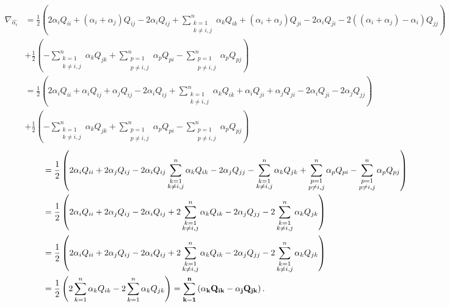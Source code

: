 \documentclass[11pt,letterpaper]{article}
\newcommand{\sumk}{\sum_{k=1}^n}
\begin{document}
\begin{enumerate}
\begin{align*}
\nabla_{\hat{\alpha_i}}&=\frac{1}{2}\left(2\alpha_iQ_{ii}+(\alpha_i +\alpha_j)Q_{ij}-2\alpha_iQ_{ij}+ \sum_{\substack{k=1\\ k\neq i,j}}^n  \alpha_k Q_{ik} + (\alpha_i +\alpha_j) Q_{ji}-2\alpha_iQ_{ji}-2((\alpha_i +\alpha_j)-\alpha_i)Q_{jj} \right)\\
&+\frac{1}{2}\left(-\sum_{\substack{k=1\\ k\neq i,j}}^n \alpha_k Q_{jk}+\sum_{\substack{p=1 \\ p\neq i,j}}^n \alpha_pQ_{pi}-\sum_{\substack{p=1 \\ p\neq i,j}}^n \alpha_pQ_{pj} \right)\\
&= \frac{1}{2}\left(2\alpha_iQ_{ii}+\alpha_iQ_{ij} +\alpha_jQ_{ij}-2\alpha_iQ_{ij}+ \sum_{\substack{k=1\\ k\neq i,j}}^n  \alpha_k Q_{ik} + \alpha_iQ_{ji} +\alpha_jQ_{ji}-2\alpha_iQ_{ji}-2\alpha_jQ_{jj} \right)\\
&+\frac{1}{2}\left(-\sum_{\substack{k=1\\ k\neq i,j}}^n \alpha_k Q_{jk}+\sum_{\substack{p=1 \\ p\neq i,j}}^n \alpha_pQ_{pi}-\sum_{\substack{p=1 \\ p\neq i,j}}^n \alpha_pQ_{pj} \right)
\end{align*}
\begin{align*}
&=\frac{1}{2}\left(2\alpha_iQ_{ii}+2\alpha_j Q_{ij}-2\alpha_i Q_{ij} \sum_{\substack{k=1\\ k\neq i,j}}^n  \alpha_k Q_{ik} -2\alpha_jQ_{jj} -\sum_{\substack{k=1\\ k\neq i,j}}^n \alpha_k Q_{jk}+\sum_{\substack{p=1 \\ p\neq i,j}}^n \alpha_pQ_{pi}-\sum_{\substack{p=1 \\ p\neq i,j}}^n \alpha_pQ_{pj}\right)\\
&=\frac{1}{2}\left(2\alpha_iQ_{ii}+ 2\alpha_j Q_{ij}-2\alpha_i Q_{ij}+2\sum_{\substack{k=1\\ k\neq i,j}}^n  \alpha_k Q_{ik} -2\alpha_jQ_{jj} -2\sum_{\substack{k=1\\ k\neq i,j}}^n \alpha_k Q_{jk}\right)\\
&= \frac{1}{2}\left(2\alpha_iQ_{ii}+ 2\alpha_j Q_{ij}-2\alpha_i Q_{ij}+2\sum_{\substack{k=1\\ k\neq i,j}}^n  \alpha_k Q_{ik} -2\alpha_jQ_{jj} -2\sum_{\substack{k=1\\ k\neq i,j}}^n \alpha_k Q_{jk}\right)\\
&=\frac{1}{2}\left(2\sum_{\substack{k=1}}^n  \alpha_k Q_{ik}-2\sum_{\substack{k=1}}^n \alpha_k Q_{jk}\right)=\bf \sumk \left( \alpha_kQ_{ik}-\alpha_j Q_{jk}\right).

\end{align*}
\end{enumerate}
\end{document}
